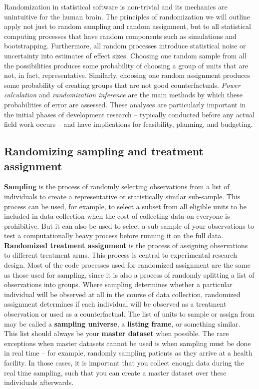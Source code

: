 Randomization in statistical software is non-trivial
and its mechanics are unintuitive for the human brain.
The principles of randomization we will outline
apply not just to random sampling and random assignment,
but to all statistical computing processes that have random components
such as simulations and bootstrapping.
Furthermore, all random processes introduce statistical noise
or uncertainty into estimates of effect sizes.
Choosing one random sample from all the possibilities produces some probability of
choosing a group of units that are not, in fact, representative.
Similarly, choosing one random assignment produces some probability of
creating groups that are not good counterfactuals.
\textit{Power calculation} and \textit{randomization inference}
are the main methods by which these probabilities of error are assessed.
These analyses are particularly important in the initial phases of development research --
typically conducted before any actual field work occurs --
and have implications for feasibility, planning, and budgeting.

\subsection{Randomizing sampling and treatment assignment}

\textbf{Sampling} is the process of randomly selecting observations
from a list of individuals to create a representative or statistically similar sub-sample.
This process can be used, for example, to select a subset from all eligible units
to be included in data collection when the cost of collecting data on everyone is prohibitive.
But it can also be used to select a sub-sample of your observations to test a computationally heavy process 
before running it on the full data.
\textbf{Randomized treatment assignment} is the process of assigning observations to different treatment arms.
This process is central to experimental research design.
Most of the code processes used for randomized assignment are the same as those used for sampling,
since it is also a process of randomly splitting a list of observations into groups.
Where sampling determines whether a particular individual
will be observed at all in the course of data collection,
randomized assignment determines if each individual will be observed
as a treatment observation or used as a counterfactual.
The list of units to sample or assign from may be called a \textbf{sampling universe},
a \textbf{listing frame}, or something similar.
This list should always be your \textbf{master dataset} when possible.
The rare exceptions when master datasets cannot be used is when sampling must be done in real time --
for example, randomly sampling patients as they arrive at a health facility.
In those cases, it is important that you collect enough data during the real time sampling,
such that you can create a master dataset over these individuals afterwards.

